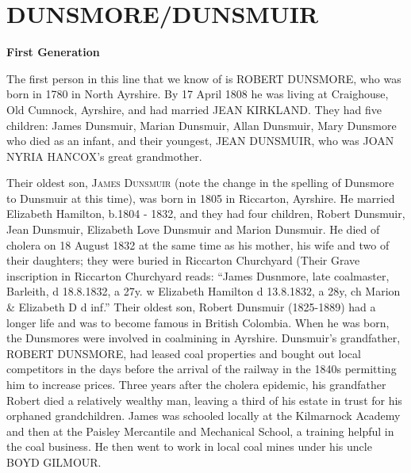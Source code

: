 \section{DUNSMORE/DUNSMUIR}

\textbf{First Generation}

The first person in this line that we know of is \uppercase{Robert Dunsmore}, who was born in 1780 in North Ayrshire.  By	
17 April 1808 he was living at Craighouse, 	Old Cumnock, Ayrshire, and had married \uppercase{Jean Kirkland}.  They had five children: James Dunsmuir, Marian Dunsmuir, Allan Dunsmuir, Mary Dunsmore who died as an infant, and  their youngest, \uppercase{Jean Dunsmuir}, who was  \uppercase{Joan Nyria Hancox}'s great grandmother.

Their oldest son, \textsc{James Dunsmuir} (note the change in the spelling of Dunsmore to Dunsmuir at this time), was born in	1805 in Riccarton, Ayrshire. He married Elizabeth Hamilton, b.1804 - 1832, and they had four children, Robert Dunsmuir, Jean Dunsmuir, Elizabeth Love Dunsmuir and Marion Dunsmuir. He died of cholera on 18 August 1832 at the same time as his mother, his wife and two of their daughters; they were buried in Riccarton Churchyard (Their Grave inscription in Riccarton Churchyard reads: ``James Dusnmore, late coalmaster, Barleith, d 18.8.1832, a 27y. w Elizabeth Hamilton d 13.8.1832, a 28y, ch Marion \& Elizabeth D d inf.'' Their oldest son, Robert Dunsmuir (1825-1889) had a longer life and was to become famous in British Colombia.  When he was born, the Dunsmores were involved in coalmining in Ayrshire. Dunsmuir's grandfather, \uppercase{Robert Dunsmore}, had leased coal properties and bought out local competitors in the days before the arrival of the railway in the 1840s permitting him to increase prices.  Three years after the cholera epidemic, his grandfather Robert died a relatively wealthy man, leaving a third of his estate in trust for his orphaned grandchildren. James was schooled locally at the Kilmarnock Academy and then at the Paisley Mercantile and Mechanical School, a training helpful in the coal business. He then went to work in local coal mines under his uncle \uppercase{Boyd Gilmour}.
